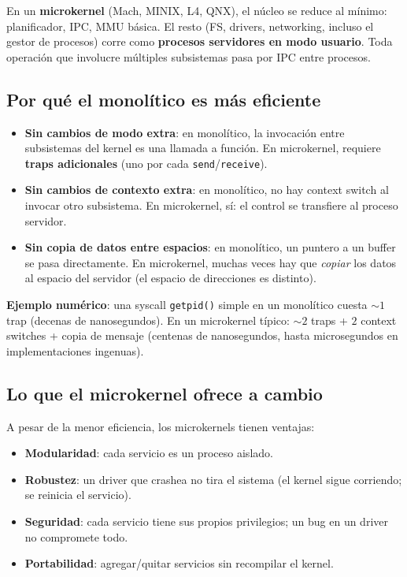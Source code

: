 \documentclass[11pt,a4paper]{article}
\begin{document}
En un \textbf{microkernel} (Mach, MINIX, L4, QNX), el núcleo se
reduce al mínimo: planificador, IPC, MMU básica. El resto (FS,
drivers, networking, incluso el gestor de procesos) corre como
\textbf{procesos servidores en modo usuario}. Toda operación que
involucre múltiples subsistemas pasa por IPC entre procesos.

\subsection*{Por qué el monolítico es más eficiente}

\begin{itemize}[leftmargin=*]
    \item \textbf{Sin cambios de modo extra}: en monolítico, la
        invocación entre subsistemas del kernel es una llamada a
        función. En microkernel, requiere \textbf{traps adicionales}
        (uno por cada \texttt{send}/\texttt{receive}).
    \item \textbf{Sin cambios de contexto extra}: en monolítico, no
        hay context switch al invocar otro subsistema. En microkernel,
        sí: el control se transfiere al proceso servidor.
    \item \textbf{Sin copia de datos entre espacios}: en monolítico,
        un puntero a un buffer se pasa directamente. En microkernel,
        muchas veces hay que \emph{copiar} los datos al espacio del
        servidor (el espacio de direcciones es distinto).
\end{itemize}

\textbf{Ejemplo numérico}: una syscall \texttt{getpid()} simple
en un monolítico cuesta $\sim 1$ trap (decenas de nanosegundos). En
un microkernel típico: $\sim 2$ traps + $2$ context switches +
copia de mensaje (centenas de nanosegundos, hasta microsegundos en
implementaciones ingenuas).

\subsection*{Lo que el microkernel ofrece a cambio}

A pesar de la menor eficiencia, los microkernels tienen ventajas:

\begin{itemize}[leftmargin=*,nosep]
    \item \textbf{Modularidad}: cada servicio es un proceso aislado.
    \item \textbf{Robustez}: un driver que crashea no tira el sistema
        (el kernel sigue corriendo; se reinicia el servicio).
    \item \textbf{Seguridad}: cada servicio tiene sus propios
        privilegios; un bug en un driver no compromete todo.
    \item \textbf{Portabilidad}: agregar/quitar servicios sin
        recompilar el kernel.
\end{itemize}
\end{document}
